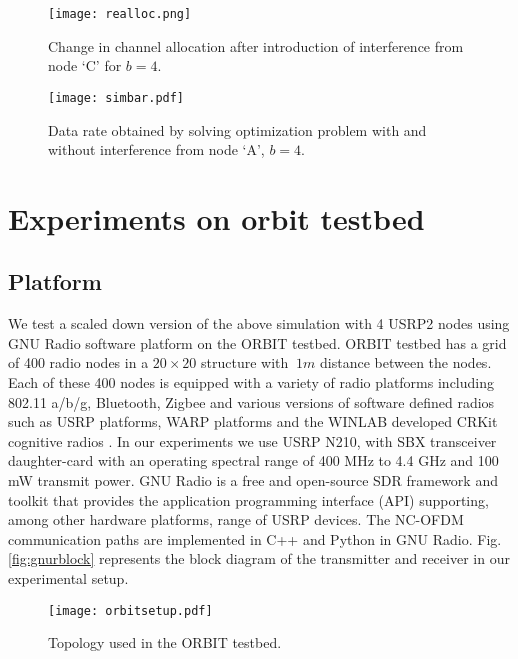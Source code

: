 \documentclass[conference]{IEEEtran}
\begin{document}
\begin{figure}[!t]
  \centering
    \texttt{[image: realloc.png]}
    \caption{Change in channel allocation after introduction of interference from node `C' for $b=4$.}
  \label{fig:realloc}
\end{figure}


\begin{figure}[!t]
  \centering
    \texttt{[image: simbar.pdf]}
    \caption{Data rate obtained by solving optimization problem with and without interference from node `A', $b=4$.}
  \label{fig:simbar}
\end{figure}


\section{Experiments on orbit testbed}
\label{sec:exp}
\subsection{Platform}
We test a scaled down version of the above simulation with 4 USRP2 nodes using GNU Radio software platform on the ORBIT testbed. ORBIT testbed has a grid of 400 radio nodes in a $20\times 20 $ structure with $~ 1m$ distance between the nodes. Each of these 400 nodes is equipped with a variety of radio platforms including 802.11 a/b/g, Bluetooth, Zigbee and various versions of software defined radios such as USRP platforms, WARP platforms and the WINLAB developed CRKit cognitive radios \cite{orbit, ettus,murphy06warp}. In our experiments we use USRP N210, with SBX transceiver daughter-card with an operating spectral range of 400 MHz to 4.4 GHz and 100 mW transmit power.   GNU Radio is a free and open-source SDR framework and toolkit that provides the application programming interface (API) supporting, among other hardware platforms, range of USRP devices.  The NC-OFDM communication paths are implemented in C++ and Python in GNU Radio. Fig. \ref{fig:gnurblock} represents the block diagram of the transmitter and receiver in our experimental setup.  

\begin{figure}[!t]
  \centering
    \texttt{[image: orbitsetup.pdf]}
    \caption{Topology used in the ORBIT testbed.}
  \label{fig:orbitsetup}
\end{figure}
\end{document}
